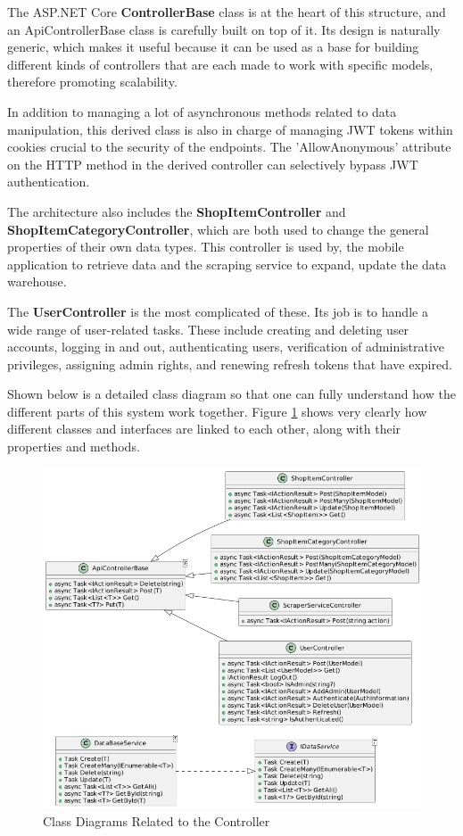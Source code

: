 The ASP.NET Core \textbf{ControllerBase} class is at the heart of this structure, and an ApiControllerBase class is carefully built on top of it. Its design is naturally generic, which makes it useful because it can be used as a base for building different kinds of controllers that are each made to work with specific models, therefore promoting scalability.

In addition to managing a lot of asynchronous methods related to data manipulation, this derived class is also in charge of managing JWT tokens within cookies crucial to the security of the endpoints. The 'AllowAnonymous' attribute on the HTTP method in the derived controller can selectively bypass JWT authentication.

The architecture also includes the \textbf{ShopItemController} and \textbf{ShopItemCategoryController}, which are both used to change the general properties of their own data types. This controller is used by, the mobile application to retrieve data and the scraping service to expand, update the data warehouse.

The \textbf{UserController} is the most complicated of these. Its job is to handle a wide range of user-related tasks. These include creating and deleting user accounts, logging in and out, authenticating users, verification of administrative privileges, assigning admin rights, and renewing refresh tokens that have expired.

Shown below is a detailed class diagram so that one can fully understand how the different parts of this system work together. Figure \ref{fig:ccd} shows very clearly how different classes and interfaces are linked to each other, along with their properties and methods.

\begin{figure}[H]
	\centering
	\includegraphics[width=1\linewidth]{img/controller_classdiagram.png}
	\caption{Class Diagrams Related to the Controller}
	\label{fig:ccd}
\end{figure}

